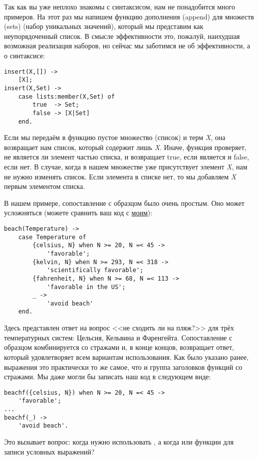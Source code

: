 Так как вы уже неплохо знакомы с синтаксисом, нам не понадобится много примеров. На этот раз мы напишем функцию дополнения (append) для множеств (sets) (набор уникальных значений), который мы представим как неупорядоченный список. В смысле эффективности это, пожалуй, наихудшая возможная реализация наборов, но сейчас мы заботимся не об эффективности, а о синтаксисе:
\begin{lstlisting}[style=erlang]
insert(X,[]) ->
    [X];
insert(X,Set) ->
    case lists:member(X,Set) of
        true  -> Set;
        false -> [X|Set]
    end.
\end{lstlisting}
Если мы передаём в функцию пустое множество (список) и терм \emph{X}, она возвращает нам список, который содержит лишь \emph{X}. Иначе, функция  проверяет, не является ли элемент частью списка, и возвращает true, если является и false, если нет. В случае, когда в нашем множестве уже присутствует элемент \emph{X}, нам не нужно изменять список. Если элемента в списке нет, то мы добавляем \emph{X} первым элементом списка.

В нашем примере, сопоставление с образцом было очень простым. Оно может усложняться (можете сравнить ваш код с \href{http://learnyousomeerlang.com/static/erlang/cases.erl}{моим}):
\begin{lstlisting}[style=erlang]
beach(Temperature) ->
    case Temperature of
        {celsius, N} when N >= 20, N =< 45 ->
            'favorable';
        {kelvin, N} when N >= 293, N =< 318 ->
            'scientifically favorable';
        {fahrenheit, N} when N >= 68, N =< 113 ->
            'favorable in the US';
        _ ->
            'avoid beach'
    end.
\end{lstlisting}
Здесь представлен ответ на вопрос <<не сходить ли  на пляж?>> для трёх температурных систем: Цельсия, Кельвина и Фаренгейта. Сопоставление с образцом комбинируется со стражами и, в конце концов, возвращает ответ, который удовлетворяет всем вариантам использования. Как было указано ранее,  выражения  это практически то же самое, что и группа заголовков функций со стражами. Мы даже могли бы записать наш код в следующем виде:
\begin{lstlisting}[style=erlang]
beachf({celsius, N}) when N >= 20, N =< 45 ->
    'favorable';
...
beachf(_) ->
    'avoid beach'.
\end{lstlisting}

Это вызывает вопрос: когда нужно использовать , а когда  или функции для записи условных выражений?
